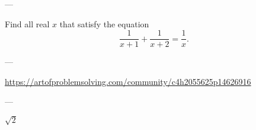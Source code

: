 
---

Find all real $x$ that satisfy the equation \[\frac1{x+1}+\frac1{x+2}=\frac1x.\]

---

\url{https://artofproblemsolving.com/community/c4h2055625p14626916}

---

$\sqrt2$
